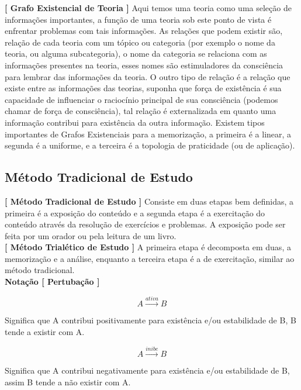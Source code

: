 \textbf{[ Grafo Existencial de Teoria ]} Aqui temos uma teoria como uma seleção de informações importantes, a função de uma teoria sob este ponto de vista é enfrentar problemas com tais informações. As relações que podem existir são, relação de cada teoria com um tópico ou categoria (por exemplo o nome da teoria, ou alguma subcategoria), o nome da categoria se relaciona com as informações presentes na teoria, esses nomes são estimuladores da consciência para lembrar das informações da teoria. O outro tipo de relação é a relação que existe entre as informações das teorias, suponha que força de existência é sua capacidade de influenciar o raciocínio principal de sua consciência (podemos chamar de força de consciência), tal relação é externalizada em quanto uma informação contribui para existência da outra informação. Existem tipos importantes de Grafos Existenciais para a memorização, a primeira é a linear, a segunda é a uniforme, e a terceira é a topologia de praticidade (ou de aplicação).

\subsection{Método Tradicional de Estudo}

\hspace{\baselineskip}

\textbf{[ Método Tradicional de Estudo ]} Consiste em duas etapas bem definidas, a primeira é a exposição do conteúdo e a segunda etapa é a exercitação do conteúdo através da resolução de exercícios e problemas. A exposição pode ser feita por um orador ou pela leitura de um livro. \\

\textbf{[ Método Trialético de Estudo ]} A primeira etapa é decomposta em duas, a memorização e a análise, enquanto a terceira etapa é a de exercitação, similar ao método tradicional.\\

\textbf{Notação [ Pertubação ]} 

$$ A \overset{ativa}{\rightarrow} B $$

Significa que A contribui positivamente para existência e/ou estabilidade de B, B tende a existir com A.

$$ A \overset{inibe}{\rightarrow} B $$

Significa que A contribui negativamente para existência e/ou estabilidade de B, assim B tende a não existir com A.

\hspace{\baselineskip}

